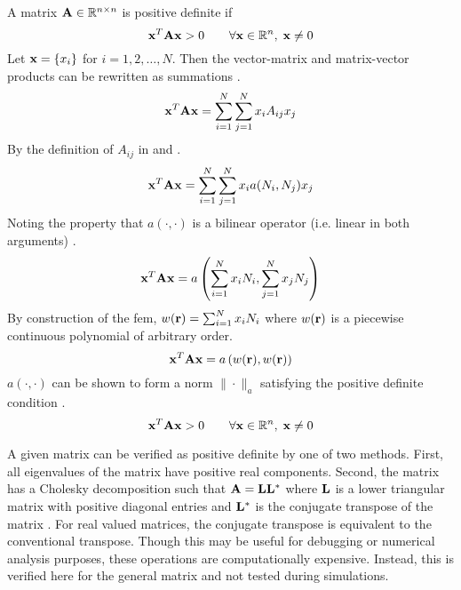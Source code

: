     A matrix $\mathbf{A} \in \mathbb{R}^{n \times n}$ is positive definite if
    \begin{equation} \label{eq:positive_definite}
      \mathbf{x}^{T} \mathbf{A} \mathbf{x} > 0 \qquad \forall \mathbf{x} \in \mathbb{R}^{n}, \; \mathbf{x} \ne 0
    \end{equation}
    Let $\mathbf{x} = \{x_i\}$ for $i = 1,2,\ldots,N$. Then the vector-matrix and 
    matrix-vector products can be rewritten as summations \cite{textbookhughes}.
    \begin{equation}
      \mathbf{x}^{T} \mathbf{A} \mathbf{x} = \sum_{i=1}^{N} \sum_{j=1}^{N} x_i A_{ij} x_j
    \end{equation}
    By the definition of $A_{ij}$ in  and 
    .
    \begin{equation}
      \mathbf{x}^{T} \mathbf{A} \mathbf{x} = 
        \sum_{i=1}^{N} \sum_{j=1}^{N} x_i a(N_i,N_j) x_j
    \end{equation}
    Noting the property that $a(\cdot,\cdot)$ is a bilinear operator (i.e.
    linear in both arguments) \cite{textbookli}.
    \begin{equation}
      \mathbf{x}^{T} \mathbf{A} \mathbf{x} =
        a \left( \sum_{i=1}^{N} x_i N_i, \sum_{j=1}^{N} x_j N_j 
        \right)
    \end{equation}
    By construction of the \gls{fem}, $w(\mathbf{r}) = \sum_{i=1}^{N} x_i N_i$ 
    where $w(\mathbf{r})$ is a piecewise continuous polynomial of arbitrary order.
    \begin{equation}
      \mathbf{x}^{T} \mathbf{A} \mathbf{x} = a \left(w(\mathbf{r}),w(\mathbf{r})\right)
    \end{equation}
    $a(\cdot,\cdot)$ can be shown to form a norm $\|\cdot \|_a$
    \cite{textbookli} satisfying the positive definite condition
    .
    \begin{equation}
      \mathbf{x}^{T} \mathbf{A} \mathbf{x} > 0 \qquad \forall \mathbf{x} \in \mathbb{R}^{n}, \; \mathbf{x} \ne 0
    \end{equation}
    
    A given matrix can be verified as positive definite by one of two methods.
    First, all eigenvalues of the matrix have positive real components. Second, 
    the matrix has a Cholesky decomposition such that $\mathbf{A} = \mathbf{L} \mathbf{L}^*$ where 
    $\mathbf{L}$ is a lower triangular matrix with positive diagonal entries and 
    $\mathbf{L}^*$ is the conjugate transpose of the matrix \cite{textbookipsen}. For 
    real valued matrices, the conjugate transpose is equivalent to the 
    conventional transpose. Though this may be useful for debugging or numerical
    analysis purposes, these operations are computationally expensive. Instead,
    this is verified here for the general matrix and not tested during
    simulations.
    
